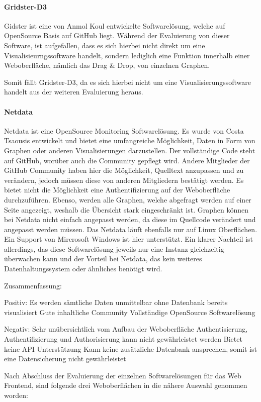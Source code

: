 \paragraph{Gridster-D3}
\label{paragraph:gridster-d3}
Gidster ist eine von Anmol Koul entwickelte Softwarelösung, welche auf
OpenSource Basis auf GitHub liegt. Während der Evaluierung von dieser Software,
ist aufgefallen, dass es sich hierbei nicht direkt um eine
Visualisieurngssoftware handelt, sondern lediglich eine Funktion innerhalb
einer Weboberfläche, nämlich das Drag \& Drop, von einzelnen Graphen.

Somit fällt Gridster-D3, da es sich hierbei nicht um eine
Visualisierungssoftware handelt aus der weiteren Evaluierung heraus.

\paragraph{Netdata}
\label{paragraph:netdata}
Netdata ist eine OpenSource Monitoring Softwarelösung. Es wurde von Costa
Tsaousis entwickelt und bietet eine umfangreiche Möglichkeit, Daten in Form von
Graphen oder anderen Visualisierungen darzustellen. Der vollständige Code steht
auf GitHub, worüber auch die Community gepflegt wird. Andere Mitglieder der
GitHub Community haben hier die Möglichkeit, Quelltext anzupassen und zu
verändern, jedoch müssen diese von anderen Mitgliedern bestätigt werden. Es
bietet nicht die Möglichkeit eine Authentifizierung auf der Weboberfläche
durchzuführen. Ebenso, werden alle Graphen, welche abgefragt werden auf einer
Seite angezeigt, weshalb die Übersicht stark eingeschränkt ist. Graphen können
bei Netdata nicht einfach angepasst werden, da diese im Quellcode verändert und
angepasst werden müssen. Das Netdata läuft ebenfalls nur auf Linux Oberflächen.
Ein Support von Mircrosoft Windows ist hier unterstützt. Ein klarer Nachteil
ist allerdings, das diese Softwarelösung jeweils nur eine Instanz gleichzeitig
überwachen kann und der Vorteil bei Netdata, das kein weiteres
Datenhaltungssystem oder ähnliches benötigt wird.

Zusammenfassung:

\begin{outline}
  Positiv:
  \1 Es werden sämtliche Daten unmittelbar ohne Datenbank bereits visualisiert
  \1 Gute inhaltliche Community
  \1 Vollständige OpenSource Softwarelösung

  Negativ:
  \1 Sehr unübersichtlich vom Aufbau der Weboberfläche
  \1 Authentisierung, Authentifizierung und Authorisierung kann nicht
  gewährleistet werden
  \1 Bietet keine API Unterstützung
  \1 Kann keine zusätzliche Datenbank ansprechen, somit ist eine Datensicherung
  nicht gewährleistet
\end{outline}
Nach Abschluss der Evaluierung der einzelnen Softwarelösungen für das Web
Frontend, sind folgende drei Weboberflächen in die nähere Auswahl genommen
worden:

